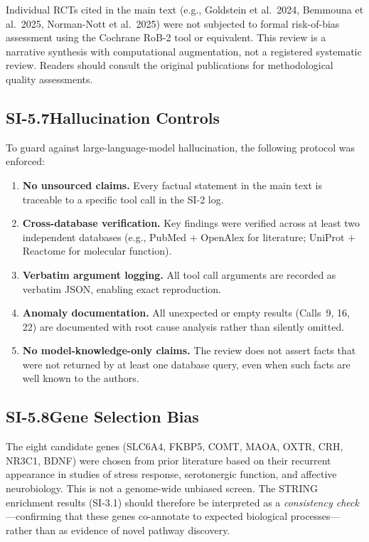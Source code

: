 Individual RCTs cited in the main text (e.g., Goldstein et al.\ 2024,
Bemmouna et al.\ 2025, Norman-Nott et al.\ 2025) were not subjected to
formal risk-of-bias assessment using the Cochrane RoB-2 tool or equivalent.
This review is a narrative synthesis with computational augmentation, not a
registered systematic review.  Readers should consult the original
publications for methodological quality assessments.

\subsection*{SI-5.7\quad Hallucination Controls}

To guard against large-language-model hallucination, the following protocol
was enforced:

\begin{enumerate}[nosep]
  \item \textbf{No unsourced claims.}  Every factual statement in the main
        text is traceable to a specific tool call in the SI-2 log.
  \item \textbf{Cross-database verification.}  Key findings were verified
        across at least two independent databases (e.g., PubMed $+$ OpenAlex
        for literature; UniProt $+$ Reactome for molecular function).
  \item \textbf{Verbatim argument logging.}  All tool call arguments are
        recorded as verbatim JSON, enabling exact reproduction.
  \item \textbf{Anomaly documentation.}  All unexpected or empty results
        (Calls~9, 16, 22) are documented with root cause analysis rather
        than silently omitted.
  \item \textbf{No model-knowledge-only claims.}  The review does not assert
        facts that were not returned by at least one database query, even
        when such facts are well known to the authors.
\end{enumerate}

\subsection*{SI-5.8\quad Gene Selection Bias}

The eight candidate genes (SLC6A4, FKBP5, COMT, MAOA, OXTR, CRH, NR3C1,
BDNF) were chosen from prior literature based on their recurrent appearance
in studies of stress response, serotonergic function, and affective
neurobiology.  This is not a genome-wide unbiased screen.  The STRING
enrichment results (SI-3.1) should therefore be interpreted as a
\emph{consistency check}---confirming that these genes co-annotate to
expected biological processes---rather than as evidence of novel pathway
discovery.

